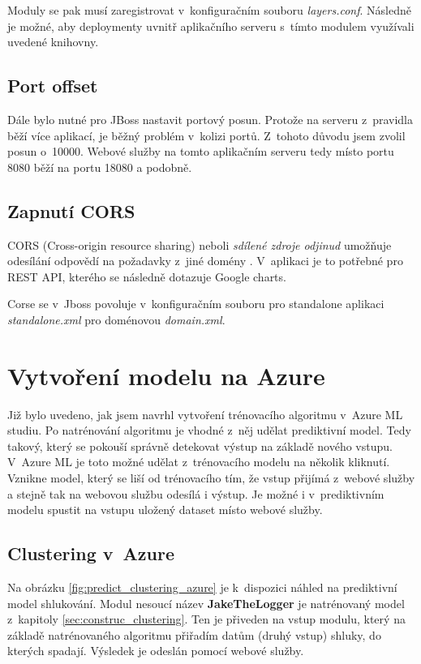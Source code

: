 \documentclass[thesis=M,czech]{FITthesis}[2012/10/20]
\begin{document}
		Moduly se pak musí zaregistrovat v~konfiguračním souboru \textit{layers.conf}. Následně je možné, aby deploymenty uvnitř aplikačního serveru s~tímto modulem využívali uvedené knihovny.
		
		\subsection{Port offset}
		\label{sec:port-offset}
		Dále bylo nutné pro JBoss nastavit portový posun. Protože na serveru z~pravidla běží více aplikací, je běžný problém v~kolizi portů. Z~tohoto důvodu jsem zvolil posun o~10000. Webové služby na tomto aplikačním serveru tedy místo portu 8080 běží na portu 18080 a podobně.
		
		\subsection{Zapnutí CORS}
		CORS (Cross-origin resource sharing) neboli \textit{sdílené zdroje odjinud} umožňuje odesílání odpovědí na požadavky z~jiné domény \cite{CORS}. V~aplikaci je to potřebné pro REST API, kterého se následně dotazuje Google charts.
		
		Corse se v~Jboss povoluje v~konfiguračním souboru pro standalone aplikaci \textit{standalone.xml} pro doménovou \textit{domain.xml}.
		
	
	\section{Vytvoření modelu na Azure}
		Již bylo uvedeno, jak jsem navrhl vytvoření trénovacího algoritmu v~Azure ML studiu. Po natrénování algoritmu je vhodné z~něj udělat prediktivní model. Tedy takový, který se pokouší správně detekovat výstup na základě nového vstupu. V~Azure ML je toto možné udělat z~trénovacího modelu na několik kliknutí. Vznikne model, který se liší od trénovacího tím, že vstup přijímá z~webové služby a stejně tak na webovou službu odesílá i výstup. Je možné i v~prediktivním modelu spustit na vstupu uložený dataset místo webové služby.
		
		\subsection{Clustering v~Azure}
			Na obrázku \ref{fig:predict_clustering_azure} je k~dispozici náhled na prediktivní model shlukování. Modul nesoucí název \textbf{JakeTheLogger} je natrénovaný model z~kapitoly \ref{sec:construc_clustering}. Ten je přiveden na vstup modulu, který na základě natrénovaného algoritmu přiřadím datům (druhý vstup) shluky, do kterých spadají. Výsledek je odeslán pomocí webové služby. 
			
\end{document}
